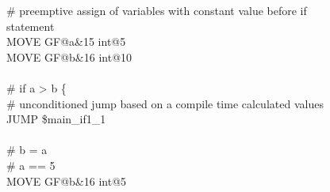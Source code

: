 \documentclass[12pt]{article}
\begin{document}
\begin{figure}
{\textcolor{comment}{\# preemptive assign of variables with constant value before if statement}\\
MOVE GF@a\&15 int@5\\
MOVE GF@b\&16 int@10\\
\\
\textcolor{comment}{\# if a > b \{}\\
\textcolor{comment}{\# unconditioned jump based on a compile time calculated values}\\
JUMP \$main\_if1\_1\\
\\
\textcolor{comment}{\# b = a}\\
\textcolor{comment}{\# a == 5}\\
MOVE GF@b\&16 int@5\\}
\end{figure}
\newpage
\end{document}
